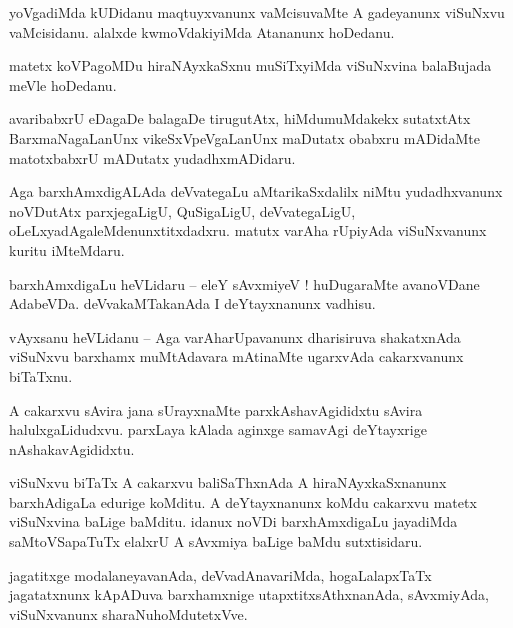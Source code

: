 \documentclass{article}
\begin{document}
\begin{mng}%
yoVgadiMda kUDidanu maqtuyxvanunx vaMcisuvaMte A gadeyanunx viSuNxvu vaMcisidanu. alalxde 
kwmoVdakiyiMda Atananunx hoDedanu.
\end{mng}

\begin{mng}%
matetx koVPagoMDu hiraNAyxkaSxnu muSiTxyiMda viSuNxvina balaBujada meVle hoDedanu.
\end{mng}

\begin{mng}%
avaribabxrU eDagaDe balagaDe tirugutAtx, hiMdumuMdakekx sutatxtAtx BarxmaNagaLanUnx 
vikeSxVpeVgaLanUnx maDutatx obabxru mADidaMte matotxbabxrU mADutatx yudadhxmADidaru.
\end{mng}

\begin{mng}%
Aga barxhAmxdigALAda deVvategaLu aMtarikaSxdalilx niMtu yudadhxvanunx noVDutAtx parxjegaLigU, 
QuSigaLigU, deVvategaLigU, oLeLxyadAgaleMdenunxtitxdadxru. matutx varAha rUpiyAda viSuNxvanunx 
kuritu iMteMdaru.
\end{mng}

\begin{mng}%
barxhAmxdigaLu heVLidaru -- eleY sAvxmiyeV ! huDugaraMte avanoVDane AdabeVDa. deVvakaMTakanAda I 
deYtayxnanunx vadhisu.
\end{mng}

\begin{mng}%
vAyxsanu heVLidanu -- Aga varAharUpavanunx dharisiruva shakatxnAda viSuNxvu barxhamx muMtAdavara 
mAtinaMte ugarxvAda cakarxvanunx biTaTxnu.
\end{mng}

\begin{mng}%
A cakarxvu sAvira jana sUrayxnaMte parxkAshavAgididxtu sAvira halulxgaLidudxvu. parxLaya kAlada 
aginxge samavAgi deYtayxrige nAshakavAgididxtu.
\end{mng}

\begin{mng}%
viSuNxvu biTaTx A cakarxvu baliSaThxnAda A hiraNAyxkaSxnanunx barxhAdigaLa edurige koMditu. A 
deYtayxnanunx koMdu cakarxvu matetx viSuNxvina baLige baMditu. idanux noVDi barxhAmxdigaLu 
jayadiMda saMtoVSapaTuTx elalxrU A sAvxmiya baLige baMdu sutxtisidaru.
\end{mng}

\begin{mng}%
jagatitxge modalaneyavanAda, deVvadAnavariMda, hogaLalapxTaTx jagatatxnunx kApADuva barxhamxnige 
utapxtitxsAthxnanAda, sAvxmiyAda, viSuNxvanunx sharaNuhoMdutetxVve.
\end{mng}
\end{document}
